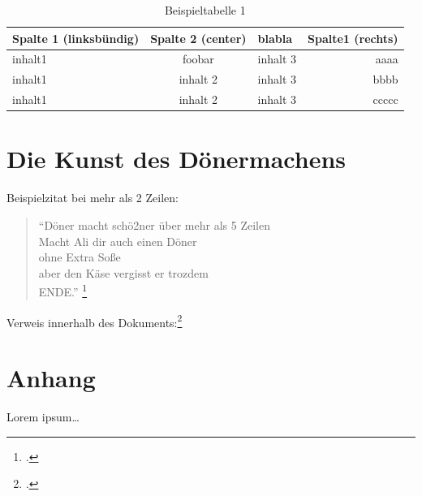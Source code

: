 \begin{table}[h]
\begin{tabularx}{\textwidth}{|l|c|X|r|}
	\hline
	\textbf{Spalte 1} (linksbündig) & \textbf{Spalte 2} (center) &
	blabla & \textbf{Spalte1} (rechts) \\
	\hline
	\hline
	inhalt1 & foobar & inhalt 3 & aaaa \\
	\hline
	inhalt1 & inhalt 2 & inhalt 3 & bbbb \\
	\hline
	inhalt1 & inhalt 2 & inhalt 3 & ccccc \\
	\hline
\end{tabularx}
\caption{Beispieltabelle 1}
\end{table}


\section{Die Kunst des Dönermachens}

Beispielzitat bei mehr als 2 Zeilen:
\begin{quote}
"`Döner macht schö2ner über mehr als 5 Zeilen\\
Macht Ali dir auch einen Döner \\
ohne Extra Soße \\
aber den Käse vergisst er trozdem\\
ENDE."' 
\footcite[Wörtlich übernommen von Ali]{praxishandbuch:bpmn2}
\end{quote}
Verweis innerhalb des Dokuments:\footcite[Vgl. \ref{Referenz} auf Seite
\pageref{Referenz} ]{testarticle}


\begin{figure}[H]
\begin{minipage}{\linewidth}
\begin{center}
\end{center}
\end{minipage}
\end{figure}

\clearpage
\section{Anhang}

Lorem ipsum\ldots
